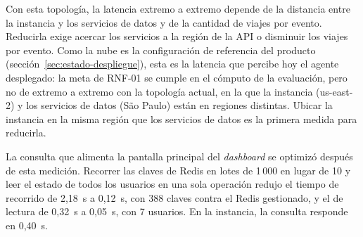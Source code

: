 Con esta topología, la latencia extremo a extremo depende de la distancia entre la instancia y los servicios de datos y de la cantidad de viajes por evento. Reducirla exige acercar los servicios a la región de la API o disminuir los viajes por evento. Como la nube es la configuración de referencia del producto (sección~\ref{sec:estado-despliegue}), esta es la latencia que percibe hoy el agente desplegado: la meta de RNF-01 se cumple en el cómputo de la evaluación, pero no de extremo a extremo con la topología actual, en la que la instancia (us-east-2) y los servicios de datos (São Paulo) están en regiones distintas. Ubicar la instancia en la misma región que los servicios de datos es la primera medida para reducirla.

La consulta que alimenta la pantalla principal del \emph{dashboard} se optimizó después de esta medición. Recorrer las claves de Redis en lotes de 1\,000 en lugar de 10 y leer el estado de todos los usuarios en una sola operación redujo el tiempo de recorrido de 2,18~s a 0,12~s, con 388 claves contra el Redis gestionado, y el de lectura de 0,32~s a 0,05~s, con 7 usuarios. En la instancia, la consulta responde en 0,40~s.

